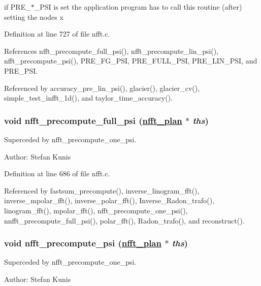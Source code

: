 if PRE\_\-$\ast$\_\-PSI is set the application program has to call this routine (after) setting the nodes x 

Definition at line 727 of file nfft.c.

References nfft\_\-precompute\_\-full\_\-psi(), nfft\_\-precompute\_\-lin\_\-psi(), nfft\_\-precompute\_\-psi(), PRE\_\-FG\_\-PSI, PRE\_\-FULL\_\-PSI, PRE\_\-LIN\_\-PSI, and PRE\_\-PSI.

Referenced by accuracy\_\-pre\_\-lin\_\-psi(), glacier(), glacier\_\-cv(), simple\_\-test\_\-infft\_\-1d(), and taylor\_\-time\_\-accuracy().\hypertarget{group__nfft_ga11}{
\subsubsection[nfft\_\-precompute\_\-full\_\-psi]{\setlength{\rightskip}{0pt plus 5cm}void nfft\_\-precompute\_\-full\_\-psi (\hyperlink{structnfft__plan}{nfft\_\-plan} $\ast$ {\em ths})}}
\label{group__nfft_ga11}


Superceded by nfft\_\-precompute\_\-one\_\-psi. 

\begin{Desc}
\item[Author:]Stefan Kunis \end{Desc}


Definition at line 686 of file nfft.c.

Referenced by fastsum\_\-precompute(), inverse\_\-linogram\_\-fft(), inverse\_\-mpolar\_\-fft(), inverse\_\-polar\_\-fft(), Inverse\_\-Radon\_\-trafo(), linogram\_\-fft(), mpolar\_\-fft(), nfft\_\-precompute\_\-one\_\-psi(), nnfft\_\-precompute\_\-full\_\-psi(), polar\_\-fft(), Radon\_\-trafo(), and reconstruct().\hypertarget{group__nfft_ga12}{
\subsubsection[nfft\_\-precompute\_\-psi]{\setlength{\rightskip}{0pt plus 5cm}void nfft\_\-precompute\_\-psi (\hyperlink{structnfft__plan}{nfft\_\-plan} $\ast$ {\em ths})}}
\label{group__nfft_ga12}


Superceded by nfft\_\-precompute\_\-one\_\-psi. 

\begin{Desc}
\item[Author:]Stefan Kunis \end{Desc}


